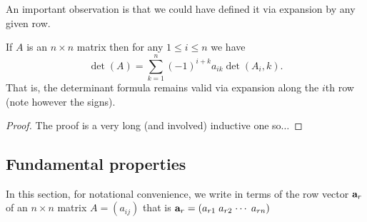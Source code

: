 \documentclass[10pt, a4paper]{article}
\begin{document}
An important observation is that we could have defined it via expansion by any given row.
\begin{lemma}\label{pre:linalg:lem:detanyrow}
    If $A$ is an $n \times n$ matrix then for any $1 \leq i \leq n$ we have
    \[
    \det(A) = \sum_{k = 1}^{n}(-1) ^ {i + k}a_{ik}\det(A_i, k).
    \]
    That is,
    the determinant formula remains valid via expansion along the $i$th row
    (note however the signs).
    \begin{proof}
        The proof is a very long (and involved) inductive one so$\dotsc$
    \end{proof}
\end{lemma}

\subsection{Fundamental properties}
In this section,
for notational convenience,
we write in terms of the row vector $\mathbf{a}_r$ of an $n \times n$ matrix $A = (a_{ij})$ that is $\mathbf{a}_r = (a_{r1}\; a_{r2}\; \dotsi \; a_{rn})$
\end{document}
